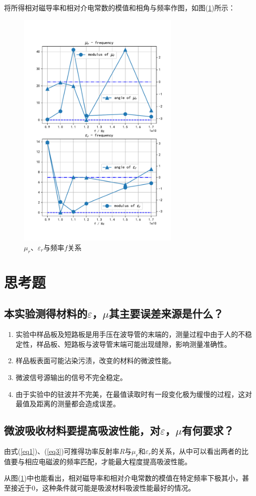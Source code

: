 \documentclass[a4paper]{article}
\begin{document}
将所得相对磁导率和相对介电常数的模值和相角与频率作图，如图(\ref{fig:data})所示：
\begin{figure}[!h]
	\centering
	\includegraphics[width=0.7\textwidth]{fig/data.pdf}
	\caption{$\mu_r$、$\varepsilon_r$与频率$f$关系}\label{fig:data}
\end{figure}

\section{思考题}
\subsection{本实验测得材料的$\varepsilon$，$\mu$其主要误差来源是什么？}
\begin{enumerate}
\item 实验中样品板及短路板是用手压在波导管的末端的，测量过程中由于人的不稳定性，样品板、短路板与波导管末端可能出现缝隙，影响测量准确性。
\item 样品板表面可能沾染污渍，改变的材料的微波性能。
\item 微波信号源输出的信号不完全稳定。
\item 由于实验中的驻波并不完美，在最值读取时有一段变化极为缓慢的过程，这对最值及距离的测量都会造成误差。
\end{enumerate}
\subsection{微波吸收材料要提高吸波性能，对$\varepsilon$，$\mu$有何要求？}
由式(\ref{eq1})、(\ref{eq3})可推得功率反射率$R$与$\mu_r$和$\varepsilon_r$的关系，从中可以看出两者的比值要与相应电磁波的频率匹配，才能最大程度提高吸波性能。

从图(\ref{fig:data})中也能看出，相对磁导率和相对介电常数的模值在特定频率下极其小，甚至接近于0，这种条件就可能是吸波材料吸波性能最好的情况。

\nocite{jiaocai}

\end{document}
